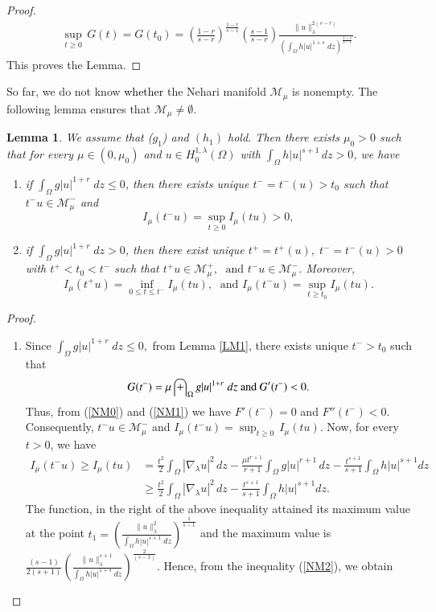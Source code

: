\documentclass[12pt, notitlepage]{article}
\newtheorem{lem}[theorem]{Lemma}
\begin{document}
{\begin{proof}
\begin{align}
    \sup_{t\geq 0}\, G(t)=G(t_0)=\left(\frac{1-r}{s-r}\right)^\frac{1-r}{s-1}\left(\frac{s-1}{s-r}\right )\frac{\|u\|_\lambda^{2(s-r)}}{\left(\int_\Omega h|u|^{1+s}\;dz\right)^\frac{1-r}{s-1}}.
\end{align}
This proves the Lemma.
\end{proof}
So far, we do not know \textcolor{black}{whether} the Nehari manifold $\mathscr{M}_\mu$ is nonempty. The following lemma ensures that $\mathscr{M}_\mu\neq\emptyset$.
\begin{lem}\label{Char}
   We assume that ($g_1$) and $(h_1)$ hold. Then there exists $\mu_0>0$ such that for every $\mu\in(0,\mu_0)$ and $u\in H^{1,\lambda}_0(\Omega)$ with $\int_\Omega h|u|^{s+1}\, dz>0$, we have
   \begin{enumerate}
       \item [(a)] if $\int_\Omega g|u|^{1+r}\;dz\leq 0$, then there exists unique $t^-=t^-(u)>t_0$ such that $t^-u\in \mathcal{M}^-_\mu$ and $$I_\mu(t^-u)=\sup_{t\geq 0} I_\mu(tu)>0,$$
       \item [(b)] if $\int_\Omega g|u|^{1+r}\;dz>0$, then there exist unique $t^+=t^+(u),\;t^-=t^-(u)>0$ with $t^+<t_0<t^-$ such that $t^+u\in\mathscr{M}^+_\mu,\;\text{ and } t^-u\in\mathscr{M}^-_\mu$. Moreover,
       $$I_\mu(t^+u)=\inf_{0\leq t\leq t^-}I_\mu(tu),\; \text{ and }I_\mu(t^-u)=\sup_{t\geq t_0}I_\mu(tu).$$
   \end{enumerate}
\end{lem}
\begin{proof}
\begin{enumerate}
   \item[($a$)] Since $\int_\Omega g|u|^{1+r}\;dz\leq 0,$ from Lemma \ref{LM1}, there exists unique $t^->t_0$ such that $$G(t^-)=\textcolor{black}{\mu}\int_\Omega g|u|^{1+r}\;dz \text{ and }G'(t^-)<0.$$
Thus, from (\ref{NM0}) and (\ref{NM1}) we have
$F'(t^-)=0$ and $F''(t^-)<0$. Consequently, $t^-u\in\mathscr{M}^-_\mu$ and $I_\mu(t^-u)=\sup_{t\geq 0}\, I_\mu(tu).$ Now, for every $t>0$, we have 
\begin{align}\label{NM2}
    I_\mu(t^-u)\geq I_\mu(tu)&=\frac{t^2}{2}\int_\Omega |\nabla_\lambda u|^2\, dz-\frac{\mu t^{r+1}}{r+1}\int_\Omega g|u|^{r+1}\, dz-\frac{t^{s+1}}{s+1}\int_\Omega h|u|^{s+1} dz\nonumber\\
    &\geq \frac{t^2}{2}\int_\Omega |\nabla_\lambda u|^2\, dz-\frac{t^{s+1}}{s+1}\int_\Omega h|u|^{s+1} dz.
\end{align}
The function, in the right of the above inequality attained its maximum value at the point $t_1=\left (\frac{\|u\|_\lambda^2}{\int_\Omega h|u|^{s+1}\;dz}\right )^\frac{1}{s-1}$ and the maximum value is $\frac{(s-1)}{2(s+1)}\left(\frac{\|u\|_\lambda^{s+1}}{\int_\Omega h|u|^{1+s}\;dz}\right)^\frac{2}{(s-1)}.$ Hence, from the inequality (\ref{NM2}), we obtain

\end{enumerate}
\end{proof}}
\end{document}
